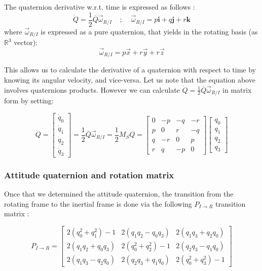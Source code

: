 \documentclass{article}
\begin{document}
\noindent The quaternion derivative w.r.t. time is expressed as follows \cite{QUA}:
\begin{equation}
\dot{Q} = \frac{1}{2}\overline{Q}\vec{\omega}_{R/I} \; \; \; \; ; \; \; \; \; \vec{\omega}_{R/I} = p\textbf{i} + q\textbf{j} + r\textbf{k}
\end{equation}
where $\vec{\omega}_{R/I}$ is expressed as a pure quaternion, that yields in the rotating basis (as $\mathbb{R}^3$ vector):
\begin{equation}
\vec{\omega}_{R/I} = p\vec{x} + r\vec{y} + r\vec{z}
\end{equation}

\noindent This allows us to calculate the derivative of a quaternion with respect to time by knowing its angular velocity, and vice-versa. Let us note that the equation above involves quaternions products. However we can calculate $\dot{Q} = \frac{1}{2}\overline{Q}\vec{\omega}_{R/I}$ in matrix form by setting:

\begin{equation}
\dot{Q} = \begin{bmatrix} \dot{q}_0 \\ \dot{q}_1 \\ \dot{q}_2 \\ \dot{q}_3 \end{bmatrix} = \frac{1}{2}\overline{Q}\vec{\omega}_{R/I} = \frac{1}{2}M_SQ = \begin{bmatrix} 0 & -p & -q & -r \\
p & 0 & r & -q \\ q & -r & 0 & p \\ r & q & -p & 0 \end{bmatrix} \begin{bmatrix} q_0 \\ q_1 \\ q_2 \\ q_3 \end{bmatrix}
\end{equation}

\subsubsection{Attitude quaternion and rotation matrix}

Once that we determined the attitude quaternion, the transition from the rotating frame to the inertial frame is done via the following $P_{I \rightarrow R}$ transition matrix \cite{QUA}:

\[
P_{I \rightarrow R} = \begin{bmatrix} 2(q_0^2 + q_1^2)-1 & 2(q_1q_2 - q_0q_3) & 2(q_1q_3 + q_2q_0) \\ 2(q_1q_2 + q_0q_3) & 2(q_0^2 + q_2^2)-1 & 2(q_2q_3 - q_1q_0) \\ 2(q_1q_3 - q_2q_0) & 2(q_2q_3 + q_1q_0) & 2(q_0^2 + q_3^2) -1\end{bmatrix}
\]
\end{document}
